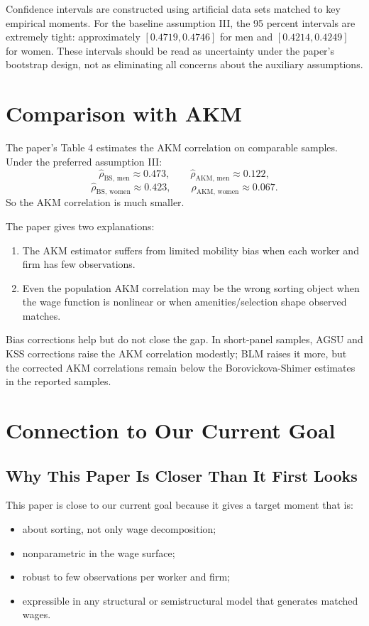 \documentclass[11pt]{article}
\begin{document}
Confidence intervals are constructed using artificial data sets matched to key empirical moments. For the baseline assumption III, the 95 percent intervals are extremely tight: approximately $[0.4719,0.4746]$ for men and $[0.4214,0.4249]$ for women. These intervals should be read as uncertainty under the paper's bootstrap design, not as eliminating all concerns about the auxiliary assumptions.

\section{Comparison with AKM}

The paper's Table 4 estimates the AKM correlation on comparable samples. Under the preferred assumption III:
\[
  \widehat\rho_{\text{BS, men}}\approx 0.473,
  \qquad
  \widehat\rho_{\text{AKM, men}}\approx 0.122,
\]
\[
  \widehat\rho_{\text{BS, women}}\approx 0.423,
  \qquad
  \widehat\rho_{\text{AKM, women}}\approx 0.067.
\]
So the AKM correlation is much smaller.

The paper gives two explanations:
\begin{enumerate}[leftmargin=*]
  \item The AKM estimator suffers from limited mobility bias when each worker and firm has few observations.
  \item Even the population AKM correlation may be the wrong sorting object when the wage function is nonlinear or when amenities/selection shape observed matches.
\end{enumerate}

Bias corrections help but do not close the gap. In short-panel samples, AGSU and KSS corrections raise the AKM correlation modestly; BLM raises it more, but the corrected AKM correlations remain below the Borovickova-Shimer estimates in the reported samples.

\section{Connection to Our Current Goal}

\subsection{Why This Paper Is Closer Than It First Looks}

This paper is close to our current goal because it gives a target moment that is:
\begin{itemize}[leftmargin=*]
  \item about sorting, not only wage decomposition;
  \item nonparametric in the wage surface;
  \item robust to few observations per worker and firm;
  \item expressible in any structural or semistructural model that generates matched wages.
\end{itemize}
\end{document}
